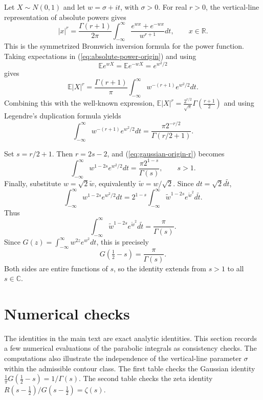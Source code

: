 \documentclass[12pt,english]{article}
\theoremstyle{plain} %
\theoremstyle{remark} %
\begin{document}
Let $X\sim N(0,1)$ and let $w=\sigma+it$, with $\sigma>0$. For real $r>0$, the vertical-line representation of absolute powers gives
\begin{equation}
|x|^r
=
\frac{\Gamma(r+1)}{2\pi}
\int_{-\infty}^{\infty}
\frac{e^{wx}+e^{-wx}}{w^{r+1}}dt,
\qquad x\in\mathbb{R}.
\label{eq:absolute-power-origin}
\end{equation}
This is the symmetrized Bromwich inversion formula for the power function. Taking expectations in (\ref{eq:absolute-power-origin}) and using
$$
\mathbb{E}e^{wX}=\mathbb{E}e^{-wX}=e^{w^2/2}
$$
gives
\begin{equation}
\mathbb{E}|X|^r
=
\frac{\Gamma(r+1)}{\pi}
\int_{-\infty}^{\infty}
w^{-(r+1)}e^{w^2/2}dt.
\label{eq:normal-absolute-origin}
\end{equation}
Combining this with the well-known expression,
$
\mathbb{E}|X|^r
=
\frac{2^{r/2}}{\sqrt{\pi}}
\Gamma\left(\frac{r+1}{2}\right)
$ and using Legendre's duplication formula yields
\begin{equation}
\int_{-\infty}^{\infty}
w^{-(r+1)}e^{w^2/2}dt
=
\frac{\pi 2^{-r/2}}{\Gamma(r/2+1)}.
\label{eq:gaussian-origin-r}
\end{equation}

Set $s=r/2+1$. Then $r=2s-2$, and (\ref{eq:gaussian-origin-r}) becomes
\begin{equation}
\int_{-\infty}^{\infty}
w^{1-2s}e^{w^2/2}dt
=
\frac{\pi 2^{1-s}}{\Gamma(s)},
\qquad s>1.
\label{eq:gaussian-origin-s}
\end{equation}
Finally, substitute $w=\sqrt{2}\tilde{w}$, equivalently
$\tilde{w}=w/\sqrt{2}$. Since $dt=\sqrt{2}d\tilde{t}$,
\[
\int_{-\infty}^{\infty}
w^{1-2s}e^{w^2/2}dt
=
2^{1-s}
\int_{-\infty}^{\infty}
\tilde{w}^{1-2s}e^{\tilde{w}^2}d\tilde{t}.
\]
Thus
$$
\int_{-\infty}^{\infty}
\tilde{w}^{1-2s}e^{\tilde{w}^2}d\tilde{t}
=
\frac{\pi}{\Gamma(s)}.
$$
Since $G(z)=\int_{-\infty}^{\infty}w^{2z}e^{w^2}dt$, this is precisely
\begin{equation}
G\left(\tfrac{1}{2}-s\right)
=
\frac{\pi}{\Gamma(s)}.
\label{eq:probabilistic-G-reciprocal}
\end{equation}
Both sides are entire functions of $s$, so the identity extends from $s>1$ to all $s\in\mathbb{C}$.

\section{Numerical checks}

The identities in the main text are exact analytic identities. This section records a few numerical evaluations of the parabolic integrals as consistency checks. The computations also illustrate the independence of the vertical-line
parameter $\sigma$ within the admissible contour class.
The first table checks the Gaussian identity
$\frac{1}{\pi}G(\tfrac{1}{2}-s)=1/\Gamma(s)$.
The second table checks the zeta identity
$R(s-\tfrac{1}{2})/G(s-\tfrac{1}{2})=\zeta(s)$.
\end{document}
